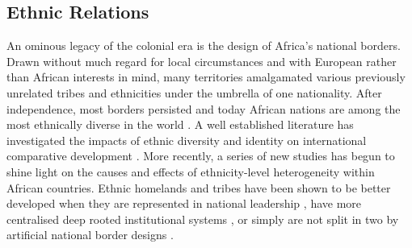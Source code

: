 \documentclass[11pt, oneside]{article}   	%
\begin{document}
\subsection{Ethnic Relations}
An ominous legacy of the colonial era is the design of Africa's national borders. Drawn without much regard for local circumstances and with European rather than African interests in mind, many territories amalgamated various previously unrelated tribes and ethnicities under the umbrella of one nationality. After independence, most borders persisted and today African nations are among the most ethnically diverse in the world \citep{Alesina_Ethnicinequality_2016}. A well established literature has investigated the impacts of ethnic diversity and identity on international comparative development \citep{Easterly_AfricaGrowthTragedy_1997,Alesina_EthnicDiversityEconomic_2005,gennaioli_modern_2007,Alesina_Ethnicinequality_2016}. More recently, a series of new studies has begun to shine light on the causes and effects of ethnicity-level heterogeneity within African countries. Ethnic homelands and tribes have been shown to be better developed when they are represented in national leadership \citep{Franck_DoesLeaderEthnicity_2012}, have more centralised deep rooted institutional systems \citep{Michalopoulos_PreColonialEthnicInstitutions_2013}, or simply are not split in two by artificial national border designs \citep{Michalopoulos_LongRunEffectsScramble_2016}.
\end{document}

